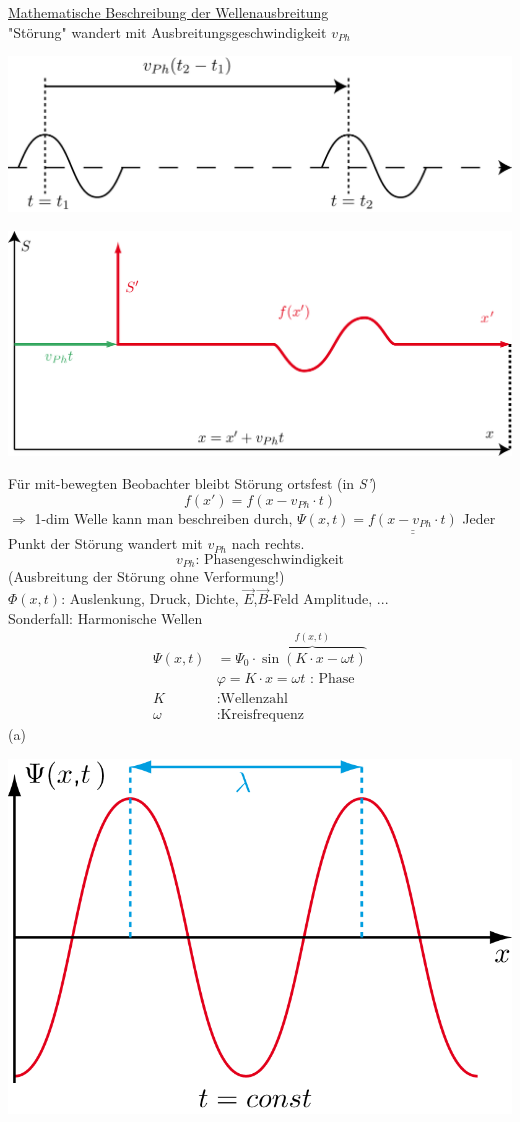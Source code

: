 \underline{Mathematische Beschreibung der Wellenausbreitung}\break \\
"Störung" wandert mit Ausbreitungsgeschwindigkeit $ v_{Ph} $
\begin{center}
	\includegraphics[width=0.7\linewidth]{skizzen/19/19B07}
\end{center}
\begin{center}
	\includegraphics[width=0.7\linewidth]{skizzen/19/19B08}
\end{center}
Für mit-bewegten Beobachter bleibt Störung ortsfest (in \emph{S'})
$$ f(x')=f(x-v_{Ph}\cdot t) $$
$ \Rightarrow $ 1-dim Welle kann man beschreiben durch, $ \Psi(x,t) = \underline{\underline{f(x-v_{Ph} \cdot t)}} $ Jeder Punkt der Störung wandert mit $ v_{Ph} $ nach rechts. $$ v_{Ph} \text{: Phasengeschwindigkeit} $$
(Ausbreitung der Störung ohne Verformung!)\\
$ \Phi(x,t) $: Auslenkung, Druck, Dichte, $ \vec{E} $,$ \vec{B} $-Feld Amplitude, ...\\ \break
Sonderfall: Harmonische Wellen
\begin{align*}
\Psi(x,t) &= \Psi_0 \cdot \overbrace{\sin(K\cdot x -\omega t)}^{f(x,t)}\\
& \varphi = K \cdot x = \omega t \text{ : Phase}\\
K&: \text{Wellenzahl}\\
\omega&: \text{Kreisfrequenz}
\end{align*}
\enter\enter\enter
\hypertarget{a}{(a)} \begin{center}
	\includegraphics[width=0.5\linewidth]{skizzen/19/19B09}
\end{center}
